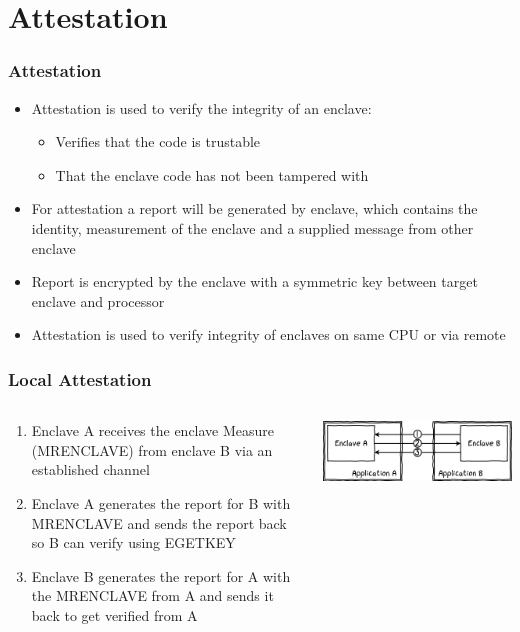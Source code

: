 \section{Attestation}
\begin{frame}
    \frametitle{Attestation}
    \begin{itemize}[<+->]
        \item Attestation is used to verify the integrity of an enclave:
        \begin{itemize}[<+->]
            \item Verifies that the code is trustable
            \item That the enclave code has not been tampered with
        \end{itemize}
        \item For attestation a report will be generated by enclave, which contains the identity, measurement of the enclave and a supplied message from other enclave
        \item Report is encrypted by the enclave with a symmetric key between target enclave and processor
        \item Attestation is used to verify integrity of enclaves on same CPU or via remote 
    \end{itemize}
\end{frame}

\begin{frame}
    \frametitle{Local Attestation}
    \begin{columns}
        \begin{column}{0.4\textwidth}
            \begin{enumerate}[<+->]
                \item Enclave A receives the enclave Measure (MRENCLAVE) from enclave B via an established channel
                \item Enclave A generates the report for B with MRENCLAVE and sends the report back so B can verify using EGETKEY
                \item Enclave B generates the report for A with the MRENCLAVE from A and sends it back to get verified from A
            \end{enumerate}
        \end{column}
        \begin{column}{0.6\textwidth}
            \includegraphics[scale=0.45]{Images/local_attestation.png}
        \end{column}
    \end{columns}
\end{frame}

